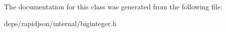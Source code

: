 The documentation for this class was generated from the following file\+:\begin{DoxyCompactItemize}
\item 
deps/rapidjson/internal/biginteger.\+h\end{DoxyCompactItemize}
